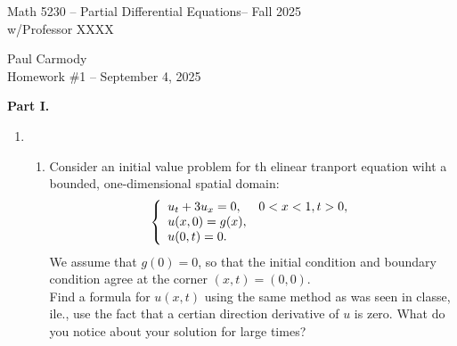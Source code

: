 \documentclass[10pt,a4paper]{report}
\newcommand{\CLASSNAME}{Math 5230 -- Partial Differential Equations}
\newcommand{\STUDENTNAME}{Paul Carmody}
\newcommand{\ASSIGNMENT}{Homework \#1 }
\newcommand{\DUEDATE}{September 4, 2025}
\newcommand{\SEMESTER}{Fall 2025}
\begin{document}
\begin{center}
	\Large{\CLASSNAME -- \SEMESTER} \\
	\large{ w/Professor XXXX}
\end{center}
\begin{center}
	\STUDENTNAME \\
	\ASSIGNMENT -- \DUEDATE\\
\end{center} 

\begin{description}
	\item \textbf{Part I.}
	\begin{enumerate}
		\item 
		\begin{enumerate}
			\item Consider an initial value problem for th elinear tranport equation wiht a bounded, one-dimensional spatial domain:
			\begin{align*}
				\left \{ \begin{array}{ll}
					u_t+3u_x=0, &0<x<1, t>0,\\
					u(x,0)=g(x),&\\
					u(0,t)=0.&
				\end{array} \right .
			\end{align*}
		We assume that $g(0)=0$, so that the initial condition and boundary condition agree at the corner $(x,t)=(0,0)$.\\
		Find a formula for $u(x,t)$ using the same method as was seen in classe, ile., use the fact that a certian direction derivative of $u$ is zero.  What do you notice about your solution for large times?
		

\end{enumerate}
\end{enumerate}
\end{description}
\end{document}
